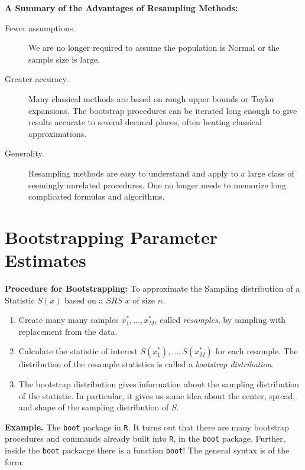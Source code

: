 \documentclass[captions=tableheading]{scrbook}
\begin{document}
\textbf{A Summary of the Advantages of Resampling Methods:}


\begin{description}
\item[Fewer assumptions.] We are no longer required to assume the population is Normal or the sample size is large.
\item[Greater accuracy.] Many classical methods are based on rough upper bounds or Taylor expansions. The bootstrap procedures can be iterated long enough to give results accurate to several decimal places, often beating classical approximations.
\item[Generality.] Resampling methods are easy to understand and apply to a large class of seemingly unrelated procedures. One no longer needs to memorize long complicated formulas and algorithms.
\end{description}
\section{Bootstrapping Parameter Estimates}
\label{sec-5_3}


\textbf{Procedure for Bootstrapping:} To approximate the Sampling distribution of a Statistic $S(x)$ based on a $SRS$ $x$ of size $n$.


\begin{enumerate}
\item Create many many samples $x_{1}^{\ast},\ldots,x_{M}^{\ast}$, called \emph{resamples}, by sampling with replacement from the data.
\item Calculate the statistic of interest $S(x_{1}^{\ast}),\ldots,S(x_{M}^{\ast})$ for each resample. The distribution of the resample statistics is called a \emph{bootstrap distribution}.
\item The bootstrap distribution gives information about the sampling distribution of the statistic. In particular, it gives us some idea about the center, spread, and shape of the sampling distribution of $S$.
\end{enumerate}












\textbf{Example.} The \texttt{boot} package in \texttt{R}. It turns out that there are many bootstrap procedures and commands already built into \texttt{R}, in the \texttt{boot} package. Further, inside the \texttt{boot} packacge there is a function \texttt{boot}! The general syntax is of the form:
\end{document}

